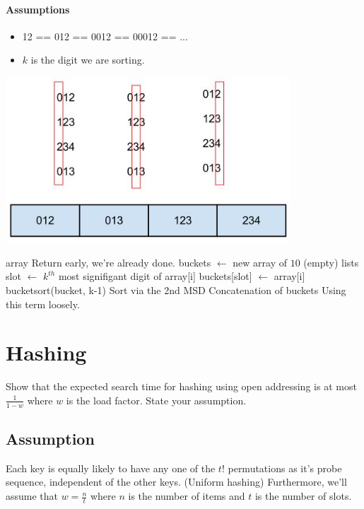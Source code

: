 \documentclass[12pt]{article}
\begin{document}
\paragraph{Assumptions}
\begin{itemize}
	\item 12 == 012 == 0012 == 00012 == ...
	\item $k$ is the digit we are sorting.
\end{itemize}
\begin{center}
\includegraphics[width=0.8\textwidth]{figures/bubblesort.jpg}
\end{center}
\clearpage
\begin{algorithm}
\begin{algorithmic}[1]
			\State \Return array
			\Comment Return early, we're already done.
		\EndIf
		\State buckets $\gets$ new array of $10$ (empty) lists
			\State slot $\gets$ $k^{th}$ most signifigant digit of array[i]
			\State buckets[slot] $\gets$ array[i]
		\EndFor
			\State bucketsort(bucket, k-1)
			\Comment Sort via the 2nd MSD
		\EndFor
		\State \Return Concatenation of buckets
		\Comment Using this term loosely.
	\EndFunction
\end{algorithmic}
\end{algorithm} %

\section{Hashing}
Show that the expected search time for hashing using open addressing is at most $\frac{1}{1- w}$ where $w$ is the load factor. State your assumption.

\subsection{Assumption}
Each key is equally likely to have any one of the $ t! $ permutations as it's probe sequence, independent of the other keys. (Uniform hashing)
Furthermore, we'll assume that $ w = \frac{n}{t} $ where $n$ is the number of items and $t$ is the number of slots.
\end{document}
